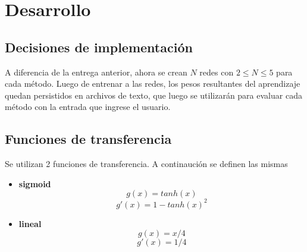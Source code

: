 \documentclass{article}
\begin{document}
\section{Desarrollo}

\subsection{Decisiones de implementación}
A diferencia de la entrega anterior, ahora se crean $N$ redes con $2 \le N \le 5$ para cada método. Luego de entrenar a las redes, los pesos resultantes del aprendizaje quedan persistidos en archivos de texto, que luego se utilizarán para evaluar cada método con la entrada
que ingrese el usuario.
\subsection{Funciones de transferencia}
Se utilizan 2 funciones de transferencia. A continaución se definen las mismas 
\begin{itemize}
 \item \textbf{sigmoid} 
    \begin{equation}
      g(x) = tanh(x)
    \end{equation} 
    \begin{equation}
      g'(x) = 1 - tanh(x)^2
    \end{equation}
  \item \textbf{lineal}
    \begin{equation}
      g(x) = x/4
    \end{equation}
    \begin{equation}
      g'(x) = 1/4
    \end{equation}
\end{itemize}
\end{document}
